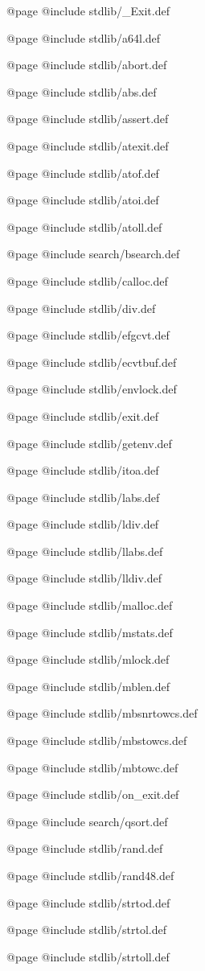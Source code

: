 @page
@include stdlib/_Exit.def

@page
@include stdlib/a64l.def

@page
@include stdlib/abort.def

@page
@include stdlib/abs.def

@page
@include stdlib/assert.def

@page
@include stdlib/atexit.def

@page
@include stdlib/atof.def

@page
@include stdlib/atoi.def

@page
@include stdlib/atoll.def

@page
@include search/bsearch.def

@page
@include stdlib/calloc.def

@page
@include stdlib/div.def

@page
@include stdlib/efgcvt.def

@page
@include stdlib/ecvtbuf.def

@page
@include stdlib/envlock.def

@page
@include stdlib/exit.def

@page
@include stdlib/getenv.def

@page
@include stdlib/itoa.def

@page
@include stdlib/labs.def

@page
@include stdlib/ldiv.def

@page
@include stdlib/llabs.def

@page
@include stdlib/lldiv.def

@page
@include stdlib/malloc.def

@page
@include stdlib/mstats.def

@page
@include stdlib/mlock.def

@page
@include stdlib/mblen.def

@page
@include stdlib/mbsnrtowcs.def

@page
@include stdlib/mbstowcs.def

@page
@include stdlib/mbtowc.def

@page
@include stdlib/on_exit.def

@page
@include search/qsort.def

@page
@include stdlib/rand.def

@page
@include stdlib/rand48.def

@page
@include stdlib/strtod.def

@page
@include stdlib/strtol.def

@page
@include stdlib/strtoll.def


